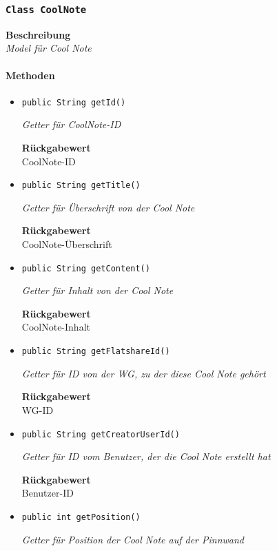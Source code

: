     \subsubsection{\texttt{Class CoolNote}}
    \textbf{Beschreibung} \\
    \textit{Model für Cool Note}
    \paragraph*{Methoden}
    \begin{itemize}
    	\item{\texttt{public String getId()}}
    	
    	\textit{Getter für CoolNote-ID}
    	
    	
    	
    	\textbf{Rückgabewert} \\
    	CoolNote-ID        \item{\texttt{public String getTitle()}}
    	
    	\textit{Getter für Überschrift von der Cool Note}
    	
    	
    	
    	\textbf{Rückgabewert} \\
    	CoolNote-Überschrift        \item{\texttt{public String getContent()}}
    	
    	\textit{Getter für Inhalt von der Cool Note}
    	
    	
    	
    	\textbf{Rückgabewert} \\
    	CoolNote-Inhalt        \item{\texttt{public String getFlatshareId()}}
    	
    	\textit{Getter für ID von der WG, zu der diese Cool Note gehört}
    	
    	
    	
    	\textbf{Rückgabewert} \\
    	WG-ID        \item{\texttt{public String getCreatorUserId()}}
    	
    	\textit{Getter für ID vom Benutzer, der die Cool Note erstellt hat}
    	
    	
    	
    	\textbf{Rückgabewert} \\
    	Benutzer-ID        \item{\texttt{public int getPosition()}}
    	
    	\textit{Getter für Position der Cool Note auf der Pinnwand}
    	

\end{itemize}
